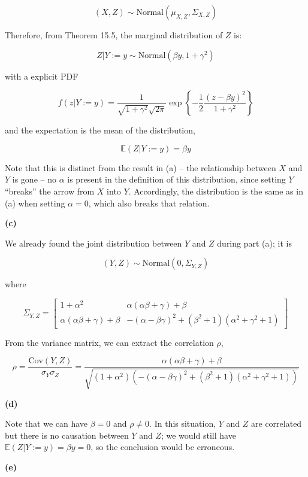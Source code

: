 \[ (X, Z) \sim \text{Normal}(\mu_{X, Z}, \Sigma_{X, Z})\]

Therefore, from Theorem 15.5, the marginal distribution of \(Z\) is:

\[ Z | Y := y \sim \text{Normal}\left( \beta y, 1 + \gamma^{2}\right) \]

with a explicit PDF

\[ f(z | Y := y) = \frac{1}{\sqrt{1 + \gamma^{2}} \sqrt{2 \pi}} \exp \left\{ -\frac{1}{2} \frac{\left( z - \beta y \right)^{2}}{1 + \gamma^{2}} \right\}\]

and the expectation is the mean of the distribution,

\[ \mathbb{E}(Z | Y := y) = \beta y \]

Note that this is distinct from the result in (a) -- the relationship
between \(X\) and \(Y\) is gone -- no \(\alpha\) is present in the
definition of this distribution, since setting \(Y\) ``breaks'' the
arrow from \(X\) into \(Y\). Accordingly, the distribution is the same
as in (a) when setting \(\alpha = 0\), which also breaks that relation.

\textbf{(c)}

We already found the joint distribution between \(Y\) and \(Z\) during
part (a); it is

\[ (Y, Z) \sim \text{Normal}(0, \Sigma_{Y, Z}) \]

where

\[ \Sigma_{Y, Z} = \begin{bmatrix}
1 + \alpha^{2} & \alpha(\alpha \beta + \gamma) + \beta \\
\alpha(\alpha \beta + \gamma) + \beta & -(\alpha - \beta\gamma)^{2} + (\beta^{2} + 1)(\alpha^{2} + \gamma^{2} + 1)
\end{bmatrix} \]

From the variance matrix, we can extract the correlation \(\rho\),

\[ \rho = \frac{\text{Cov}(Y, Z)}{\sigma_Y \sigma_Z} = \frac{\alpha(\alpha \beta + \gamma) + \beta}{\sqrt{(1 + \alpha^{2})(-(\alpha - \beta\gamma)^{2} + (\beta^{2} + 1)(\alpha^{2} + \gamma^{2} + 1))}}\]

\textbf{(d)}

Note that we can have \(\beta = 0\) and \(\rho \neq 0\). In this
situation, \(Y\) and \(Z\) are correlated but there is no causation
between \(Y\) and \(Z\); we would still have
\(\mathbb{E}(Z | Y := y) = \beta y = 0\), so the conclusion would be
erroneous.

\textbf{(e)}

